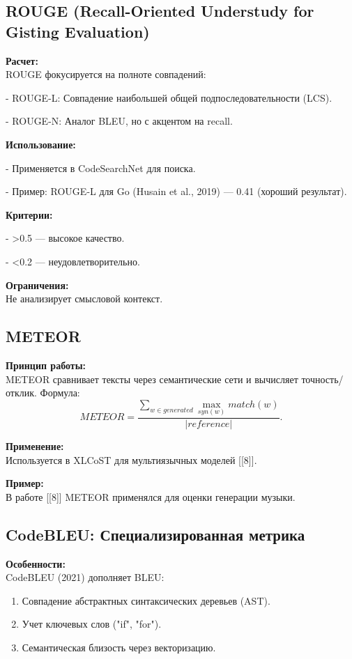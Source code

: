 \documentclass[14pt]{article}
\theoremstyle{definition}
\begin{document}
\subsection{ROUGE (Recall-Oriented Understudy for Gisting Evaluation)}

\textbf{Расчет:} \\
ROUGE фокусируется на полноте совпадений:

    
- ROUGE-L: Совпадение наибольшей общей подпоследовательности (LCS).
    
- ROUGE-N: Аналог BLEU, но с акцентом на recall.


\textbf{Использование:}

    
- Применяется в CodeSearchNet для поиска.
    
- Пример: ROUGE-L для Go (Husain et al., 2019) — 0.41 (хороший результат).


\textbf{Критерии:}

    
- >0.5 — высокое качество.
    
- <0.2 — неудовлетворительно.


\textbf{Ограничения:} \\
Не анализирует смысловой контекст.

\subsection{METEOR}

\textbf{Принцип работы:} \\
METEOR сравнивает тексты через семантические сети и вычисляет точность/отклик. Формула:
\[
METEOR = \frac{\sum_{w \in generated} \max_{syn(w)} match(w)}{|reference|}.
\]

\textbf{Применение:} \\
Используется в XLCoST для мультиязычных моделей [[8]].

\textbf{Пример:} \\
В работе [[8]] METEOR применялся для оценки генерации музыки.

\subsection{CodeBLEU: Специализированная метрика}

\textbf{Особенности:} \\
CodeBLEU (2021) дополняет BLEU:
\begin{enumerate}
    \item Совпадение абстрактных синтаксических деревьев (AST).
    \item Учет ключевых слов ("if", "for").
    \item Семантическая близость через векторизацию.
\end{enumerate}
\end{document}
